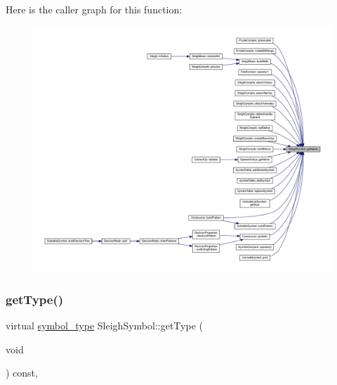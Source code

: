 Here is the caller graph for this function\+:
\nopagebreak
\begin{figure}[H]
\begin{center}
\leavevmode
\includegraphics[width=350pt]{class_sleigh_symbol_a0a833d55302c4e1cfd77a7726b72a04a_icgraph}
\end{center}
\end{figure}
\mbox{\label{class_sleigh_symbol_a2f6e5903e461084c29f95ea024883950}} 
\subsubsection{\texorpdfstring{getType()}{getType()}}
{\footnotesize\ttfamily virtual \mbox{\hyperlink{class_sleigh_symbol_aba70f7f332fd63488c5ec4bd7807db41}{symbol\+\_\+type}} Sleigh\+Symbol\+::get\+Type (\begin{DoxyParamCaption}\item[{void}]{ }\end{DoxyParamCaption}) const\hspace{0.3cm}{\ttfamily [inline]}, {\ttfamily [virtual]}}



